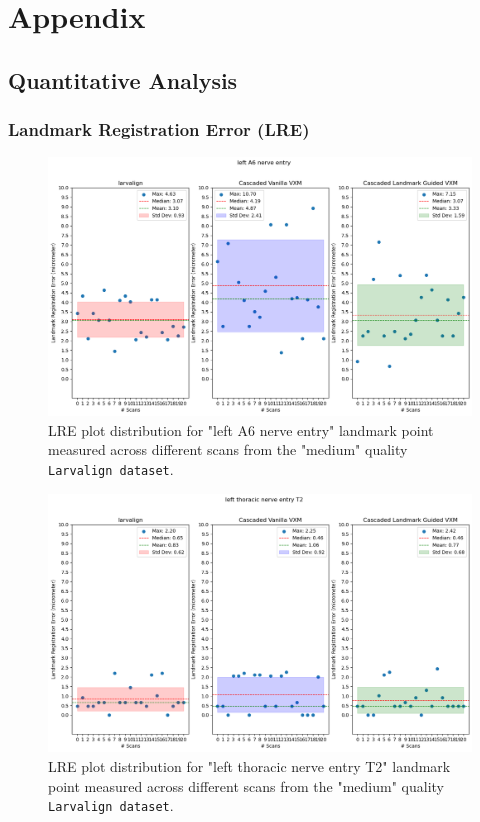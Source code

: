 \chapter{Appendix}\label{cha::appendix}
	\section{Quantitative Analysis}
	\subsection{Landmark Registration Error (LRE)}	
	\begin{figure}[h]
		\centering
		\includegraphics[width=0.75\columnwidth]{resources/chapter5_fresh/output/left A6 nerve entry.png}
		\caption{LRE plot distribution for "left A6 nerve entry" landmark point measured across different scans from the "medium" quality \texttt{Larvalign dataset}.}
		\label{fig:landmark1}
	\end{figure}

	\begin{figure}[h]
		\centering
		\includegraphics[width=0.75\columnwidth]{resources/chapter5_fresh/output/left thoracic nerve entry T2.png}
		\caption{LRE plot distribution for "left thoracic nerve entry T2" landmark point measured across different scans from the "medium" quality \texttt{Larvalign dataset}.}
		\label{fig:landmark2}
	\end{figure}

